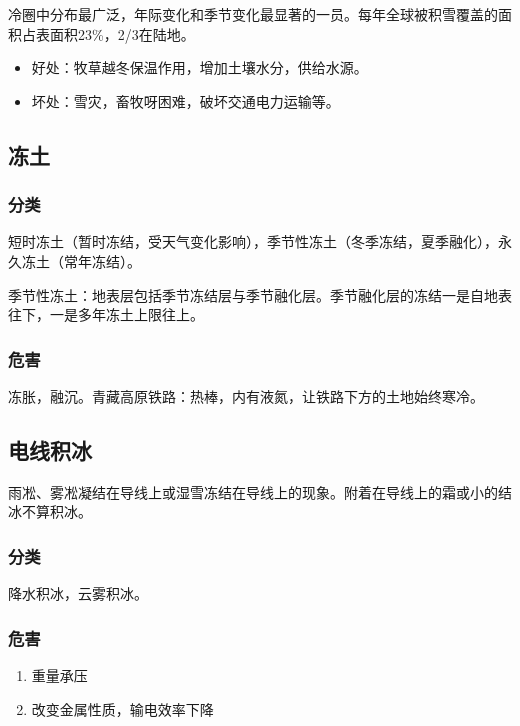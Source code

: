 \documentclass[UTF8,11pt]{ctexbook}
\begin{document}
冷圈中分布最广泛，年际变化和季节变化最显著的一员。每年全球被积雪覆盖的面积占表面积23\%，2/3在陆地。
\begin{itemize}
    \item 好处：牧草越冬保温作用，增加土壤水分，供给水源。
    \item 坏处：雪灾，畜牧呀困难，破坏交通电力运输等。
\end{itemize}

\subsection{冻土}

\subsubsection{分类}

短时冻土（暂时冻结，受天气变化影响），季节性冻土（冬季冻结，夏季融化），永久冻土（常年冻结）。

季节性冻土：地表层包括季节冻结层与季节融化层。季节融化层的冻结一是自地表往下，一是多年冻土上限往上。

\subsubsection{危害}

冻胀，融沉。青藏高原铁路：热棒，内有液氮，让铁路下方的土地始终寒冷。

\subsection{电线积冰}

雨凇、雾凇凝结在导线上或湿雪冻结在导线上的现象。附着在导线上的霜或小的结冰不算积冰。

\subsubsection{分类}

降水积冰，云雾积冰。

\subsubsection{危害}
\begin{enumerate}
    \item 重量承压
    \item 改变金属性质，输电效率下降
\end{enumerate}
\end{document}
